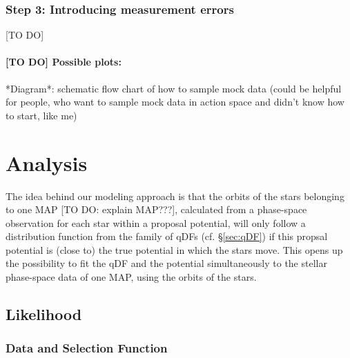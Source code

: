 \documentclass[12pt,preprint]{aastex}
\begin{document}
\subsubsection{Step 3: Introducing measurement errors}

[TO DO]

\paragraph{[TO DO] Possible plots:} *Diagram*: schematic flow chart of how to sample mock data (could be helpful for people, who want to sample mock data in action space and didn't know how to start, like me)


\section{Analysis}

The idea behind our modeling approach is that the orbits of the stars belonging to one MAP [TO DO: explain MAP???], calculated from a phase-space observation for each star within a proposal potential,  will only follow a distribution function from the family of qDFs (cf. \S\ref{sec:qDF}) if this propsal potential is (close to) the true potential in which the stars move. This opens up the possibility to fit the qDF and the potential simultaneously to the stellar phase-space data of one MAP, using the orbits of the stars. 

\subsection{Likelihood}

\subsubsection{Data and Selection Function} 
\end{document}
